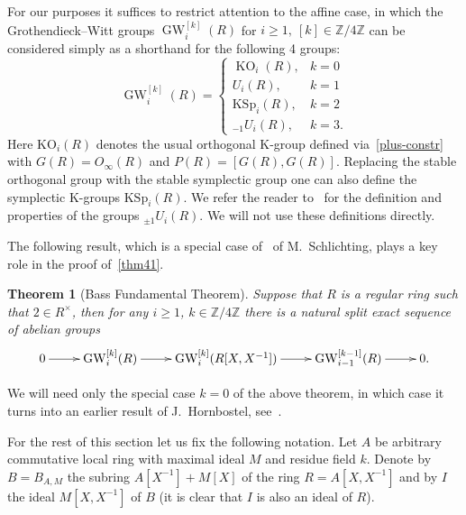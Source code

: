 \documentclass[oneside, 8pt]{amsart}
\newtheorem{externaltheorem}[lemma]{Theorem}
\theoremstyle{remark}
\theoremstyle{definition}
\numberwithin{lemma}{section}
\numberwithin{prop}{section}
\numberwithin{corollary}{section}
\numberwithin{externaltheorem}{section}
\DeclareMathOperator{\KO}{KO}
\DeclareMathOperator{\GW}{GW}
\newcommand{\ZZ}{\mathbb{Z}}
\numberwithin{equation}{section}
\begin{document}
For our purposes it suffices to restrict attention to the affine case, in which  the Grothendieck--Witt groups $\GW_i^{[k]}(R)$ for $i \geq 1,\ [k] \in \ZZ/4\ZZ$ can be considered simply as a shorthand for the following 4 groups:
\begin{equation} \label{GW-concrete} \GW_i^{[k]}(R) = \left\{\begin{array}{ll} \KO_i(R), & k = 0 \\ U_i(R), & k = 1 \\ \mathrm{KSp}_i(R), & k = 2 \\ {}_{-1}\!U_i(R), & k = 3. \end{array}\right. \end{equation}
Here $\mathrm{KO}_i(R)$ denotes the usual orthogonal K-group defined via~\eqref{plus-constr} with $G(R) = O_\infty(R)$ and $P(R) = [G(R), G(R)]$.
Replacing the stable orthogonal group with the stable symplectic group one can also define the symplectic K-groups $\mathrm{KSp}_i(R)$.
We refer the reader to~\cite{Ka80} for the definition and properties of the groups ${}_{\pm 1}\!U_i(R)$. We will not use these definitions directly.

The following result, which is a special case of~\cite[Theorem~9.13]{Sch16} of M.~Schlichting, plays a key role in the proof of~\cref{thm41}.
\begin{externaltheorem}[Bass Fundamental Theorem]\label{bass-ft} Suppose that $R$ is a regular ring such that $2 \in R^\times$, 
then for any $i\geq 1$, $k\in \ZZ/4\ZZ$ there is a natural split exact sequence of abelian groups \[ \xymatrix{ 0 \ar[r] & \GW_i^{[k]}(R) \ar[r] & \GW_i^{[k]}(R[X, X^{-1}]) \ar[r]  & \GW_{i-1}^{[k-1]}(R) \ar[r] & 0.} \] \end{externaltheorem}
We will need only the special case $k=0$ of the above theorem, in which case it turns into an earlier result of J.~Hornbostel, see~\cite[Corollary~5.3]{Ho05}.

For the rest of this section let us fix the following notation.
Let $A$ be arbitrary commutative local ring with maximal ideal $M$ and residue field $k$.
Denote by $B = B_{A, M}$ the subring $A[X^{-1}] + M[X]$ of the ring $R = A[X, X^{-1}]$ and
by $I$ the ideal $M[X, X^{-1}]$ of $B$ (it is clear that $I$ is also an ideal of $R$).
\end{document}
